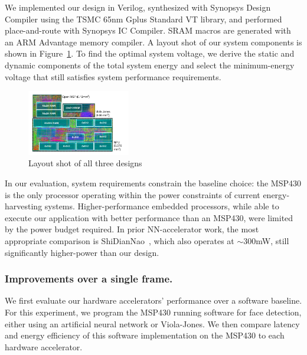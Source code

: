 We implemented our design in Verilog, synthesized with Synopsys Design Compiler using the TSMC 65nm Gplus Standard VT library, and performed place-and-route with Synopsys IC Compiler. SRAM macros are generated with an ARM Advantage memory compiler. A layout shot of our system components is shown in Figure~\ref{fig:layout_shot}. To find the optimal system voltage, we derive the static and dynamic components of the total system energy and select the minimum-energy voltage that still satisfies system performance requirements.

\begin{figure}[h]
\centering
    \begin{center}
      \includegraphics[width=0.4\textwidth]{nsp-figs/layout.pdf}
    \end{center}
    \caption{Layout shot of all three designs}
    \label{fig:layout_shot}
\end{figure}


In our evaluation, system requirements constrain the baseline choice: the MSP430 is the only processor operating within the power constraints of current energy-harvesting systems.
Higher-performance embedded processors, while able to execute our application with better performance than an MSP430, were limited by the power budget required.
In prior NN-accelerator work, the most appropriate comparison is ShiDianNao~\cite{shidiannao}, which also operates at $ \sim$300mW, still significantly higher-power than our design.

\subsubsection{Improvements over a single frame.}

We first evaluate our hardware accelerators' performance over a software baseline.
For this experiment, we program the MSP430 running software for face detection, either using an artificial neural network or Viola-Jones.
We then compare latency and energy efficiency of this software implementation on the MSP430 to each hardware accelerator.

